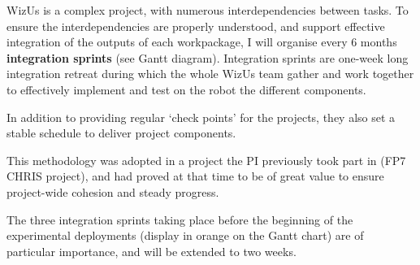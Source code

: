 \documentclass[11pt,a4paper]{report}
\newcommand{\project}{WizUs\xspace}
\begin{document}
\project is a complex project, with numerous interdependencies between tasks.
To ensure the interdependencies are properly understood, and support effective
integration of the outputs of each workpackage, I will organise every 6 months
\textbf{integration sprints} (see Gantt diagram). Integration sprints are
one-week long integration retreat during which the whole \project team gather
and work together to effectively implement and test on the robot the different
components.

In addition to providing regular `check points' for the projects, they also set
a stable schedule to deliver project components.

This methodology was adopted in a project the PI previously took part in (FP7
CHRIS project), and had proved at that time to be of great value to ensure
project-wide cohesion and steady progress.

The three integration sprints taking place before the beginning of the
experimental deployments (display in orange on the Gantt chart) are of
particular importance, and will be extended to two weeks.


%
%
%
%
%
%
\end{document}
